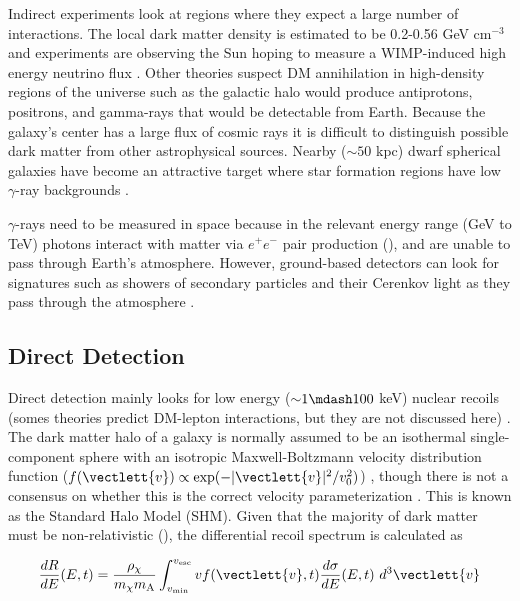 Indirect experiments look at regions where they expect a large number of interactions.  The local
dark matter density is estimated to be 0.2-0.56 GeV cm$^{-3}$  and experiments are observing
the Sun hoping to measure a WIMP-induced high energy neutrino flux .  Other theories suspect
DM annihilation in high-density regions of the universe such as the galactic halo would produce
antiprotons, positrons, and gamma-rays that would be detectable from Earth.  Because the galaxy's center
has a large flux of cosmic rays it is difficult to distinguish possible dark matter from other astrophysical
sources.  Nearby (${\sim} 50$ kpc) dwarf spherical
galaxies have become an attractive target where star formation regions have low $\gamma$-ray backgrounds .

$\gamma$-rays need to be measured in space because in the relevant energy range (GeV to TeV) photons interact
with matter via $e^{+}e^{-}$ pair production (), and are unable to pass through Earth's atmosphere.  However,
ground-based detectors can look for signatures such as showers of secondary particles and their Cerenkov
light as they pass through the atmosphere .



\subsection{Direct Detection} \label{subsec:direct}
Direct detection mainly looks for low energy (${\sim} 1 \mdash 100$ keV) nuclear recoils (somes theories predict DM-lepton
interactions,
but they are not discussed here) .  The dark matter halo of a galaxy is normally assumed to be an isothermal
single-component sphere with an isotropic Maxwell-Boltzmann velocity distribution function
($f(\vectlett{v}) \propto \mathrm{exp}(-|\vectlett{v}|^2 / v_0^2)$) , though there is not a consensus on
whether this is the correct velocity parameterization
.  This is known as the Standard Halo Model (SHM).  Given that the majority of dark matter must be
non-relativistic (), the differential recoil spectrum is calculated as 

\begin{equation} \label{eq:dr_de}
\frac{dR}{dE}(E, t) = \frac{\rho_{\chi}}{m_{\chi}m_{\mathrm{A}}} \int_{v_{\mathrm{min}}}^{v_{\mathrm{esc}}}
v f(\vectlett{v}, t) \frac{d\sigma}{dE}(E, t)\ d^{3}\vectlett{v}
\end{equation}

